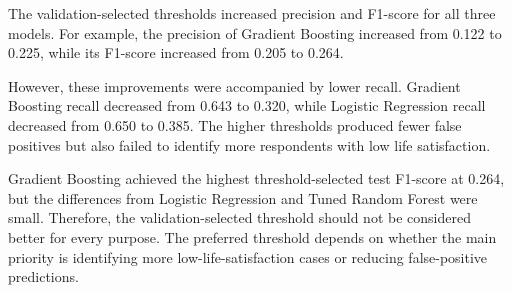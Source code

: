 \documentclass[12pt]{article}
\begin{document}
\begin{table}[H]
\centering
\caption{Test-Set Results at Default and Validation-Selected Thresholds}
\label{tab:threshold_results}
\scriptsize
{}
\end{table}

The validation-selected thresholds increased precision and F1-score for all three models. For example, the precision of Gradient Boosting increased from 0.122 to 0.225, while its F1-score increased from 0.205 to 0.264.

However, these improvements were accompanied by lower recall. Gradient Boosting recall decreased from 0.643 to 0.320, while Logistic Regression recall decreased from 0.650 to 0.385. The higher thresholds produced fewer false positives but also failed to identify more respondents with low life satisfaction.

Gradient Boosting achieved the highest threshold-selected test F1-score at 0.264, but the differences from Logistic Regression and Tuned Random Forest were small. Therefore, the validation-selected threshold should not be considered better for every purpose. The preferred threshold depends on whether the main priority is identifying more low-life-satisfaction cases or reducing false-positive predictions.
\end{document}
